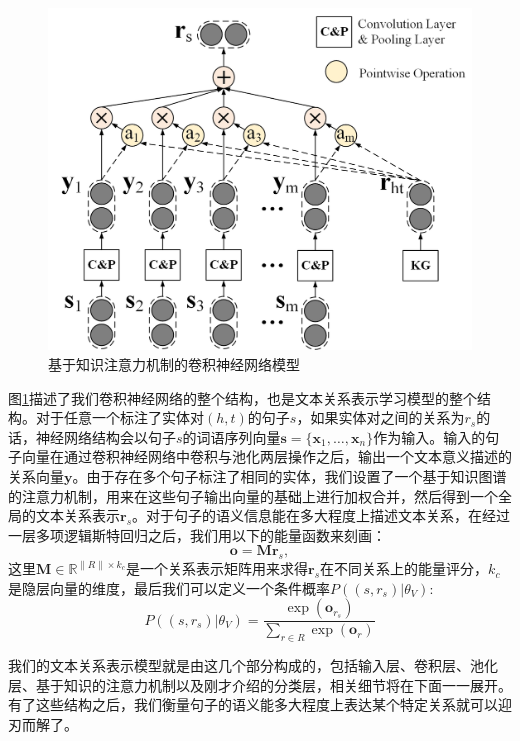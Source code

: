 \begin{figure}[h]
\centering
\includegraphics[width=0.9\columnwidth]{figures/ch3/cnn.jpg}
\caption{基于知识注意力机制的卷积神经网络模型}
\label{fig3:cnn}
\end{figure}

图\ref{fig3:cnn}描述了我们卷积神经网络的整个结构，也是文本关系表示学习模型的整个结构。对于任意一个标注了实体对$(h, t)$的句子$s$，如果实体对之间的关系为$r_s$的话，神经网络结构会以句子$s$的词语序列向量$\mathbf{s} = \{\mathbf{x}_1, \ldots, \mathbf{x}_n \}$作为输入。输入的句子向量在通过卷积神经网络中卷积与池化两层操作之后，输出一个文本意义描述的关系向量$\mathbf{y}$。由于存在多个句子标注了相同的实体，我们设置了一个基于知识图谱的注意力机制，用来在这些句子输出向量的基础上进行加权合并，然后得到一个全局的文本关系表示$\mathbf{r}_s$。对于句子的语义信息能在多大程度上描述文本关系，在经过一层多项逻辑斯特回归之后，我们用以下的能量函数来刻画：
\begin{equation}
\mathbf{o} = \mathbf{M}\mathbf{r}_s,
\label{eq3:cnn_distance}
\end{equation}
这里$\mathbf{M} \in \mathbb{R}^{\|R\| \times k_c} $是一个关系表示矩阵用来求得$\mathbf{r}_s$在不同关系上的能量评分，$k_c$是隐层向量的维度，最后我们可以定义一个条件概率$P((s, r_s)|{\theta_V})$:
\begin{equation}
P((s, r_s)|{\theta_V}) = \frac{\exp(\mathbf{o}_{r_s})}{\sum_{r \in R} \exp(\mathbf{o}_{r})}
\label{eq3:cnn_distance1}
\end{equation}

我们的文本关系表示模型就是由这几个部分构成的，包括输入层、卷积层、池化层、基于知识的注意力机制以及刚才介绍的分类层，相关细节将在下面一一展开。有了这些结构之后，我们衡量句子的语义能多大程度上表达某个特定关系就可以迎刃而解了。



